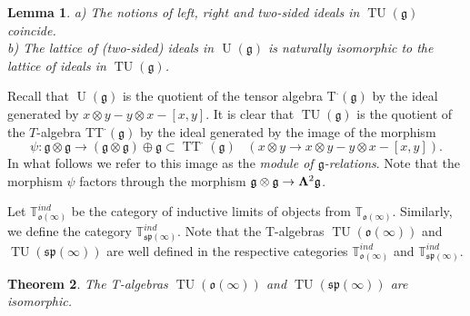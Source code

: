 \documentclass{emsprocart}
\newtheorem{theorem}{Theorem}[section]
\newtheorem{lemma}[theorem]{Lemma}
\begin{document}
\begin{lemma}\label{L73}a) The notions of left, right and two-sided ideals in $\operatorname{TU}(\mathfrak g)$ coincide.\\
b) The lattice of (two-sided) ideals in $\operatorname{U}(\mathfrak g)$ is naturally isomorphic to the lattice of ideals in $\operatorname{TU}(\mathfrak g)$.
\end{lemma}
Recall that $\operatorname{U}(\mathfrak g)$ is the quotient of the tensor algebra T$^\cdot(\mathfrak g)$ by the ideal generated by $x\otimes y-y\otimes x-[x, y]$. It is clear that $\operatorname{TU}(\mathfrak g)$ is the quotient of the $T$-algebra TT$^\cdot(\mathfrak g)$  by the ideal generated by the image of the morphism
$$\psi: \mathfrak g\otimes \mathfrak g\to (\mathfrak g\otimes\mathfrak g)\oplus\mathfrak g\subset \operatorname{TT}^\cdot(\mathfrak g)\hspace{10pt}(x\otimes y\to x\otimes y-y\otimes x-[x, y]).$$
In what follows we refer to this image as the {\it module of $\mathfrak g$-relations}. Note that the morphism $\psi$ factors through the morphism $\mathfrak g\otimes\mathfrak g\to{\bf \Lambda}^2\mathfrak g$.

Let $\mathbb T_{\mathfrak o(\infty)}^{ind}$ be the category of inductive limits of objects from $\mathbb T_{\mathfrak o(\infty)}$. Similarly, we define the category $\mathbb T_{\mathfrak{sp}(\infty)}^{ind}$. Note that the T-algebras $\operatorname{TU}(\mathfrak o(\infty))$ and $\operatorname{TU}(\mathfrak{sp}(\infty))$ are well defined in the respective categories $\mathbb T_{\mathfrak o(\infty)}^{ind}$ and $\mathbb T_{\mathfrak{sp}(\infty)}^{ind}$.
\begin{theorem}\label{Tosp}The T-algebras $\operatorname{TU}(\mathfrak o(\infty))$ and $\operatorname{TU}(\mathfrak{sp}(\infty))$ are isomorphic.\end{theorem}



\end{document}
